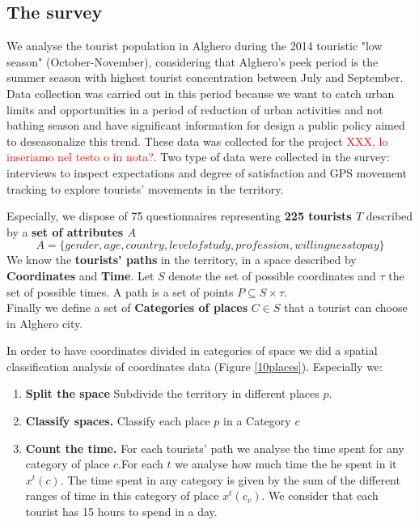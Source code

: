\documentclass[a4paper]{article}
\begin{document}
\subsection{The survey}
We analyse the tourist population in Alghero during the 2014 touristic "low season" (October-November), considering that Alghero's peek period is the summer season with highest tourist concentration between July and September. Data collection was carried out in this period because we want to catch urban limits and opportunities in a period of reduction of urban activities and not bathing season and have significant information for design a public policy aimed to deseasonalize this trend. These data was collected for the project \textcolor{red}{XXX, lo inseriamo nel testo o in nota?}.
Two type of data were collected in the survey: interviews to inspect expectations and degree of satisfaction and GPS movement tracking to explore tourists' movements in the territory.

Especially, we dispose of 75 questionnaires representing \textbf{225 tourists $T$} described by a \textbf{set of attributes $A$}
\begin{equation}
A=\{gender,age,country,level of study,profession,willingness to pay\}
\end{equation}
We know the \textbf{tourists' paths} in the territory, in a space described by \textbf{Coordinates} and \textbf{Time}.
Let $S$ denote the set of possible coordinates and $\tau$ the set of possible times.  A path is a set of points $P \subseteq S \times \tau$.\\
Finally we define a set of \textbf{Categories of places} $C \in S$ that a tourist can choose in Alghero city.

In order to have coordinates divided in categories of space we did a spatial classification analysis of  coordinates data (Figure \ref{10places}). Especially we:
\begin{enumerate}
\item \textbf{Split the space} Subdivide the territory in different places $p$.
\item \textbf{Classify spaces.} Classify each place $p$ in a Category $c$
\item \textbf{Count the time.} For each tourists' path we analyse the time spent for any category of place $c$.For each $t$ we analyse how much time the he spent in it $x^t (c)$. The time spent in any category is given by the sum of the different ranges of time in this category of place $x^t (c_v)$. We consider that each tourist has 15 hours to spend in a day.
\end{enumerate}
\end{document}
